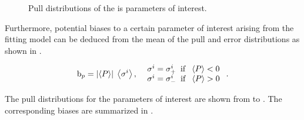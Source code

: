 \begin{figure}[!t]
  \centering
  \begin{subfigure}{0.5\textwidth}
    \raggedright
    \scalebox{0.57}{}
    \caption{}
    \label{pull_ACP0}
  \end{subfigure}%
  \hfill%
  \begin{subfigure}{0.5\textwidth}
    \raggedleft
    \scalebox{0.57}{}
    \caption{}
    \label{pull_ACPperp}
  \end{subfigure}
  \begin{subfigure}{0.5\textwidth}
    \raggedright
    \scalebox{0.57}{}
    \caption{}
    \label{pull_ACPpar}
  \end{subfigure}%
  \hfill%
  \begin{subfigure}{0.5\textwidth}
    \raggedleft
    \scalebox{0.57}{}
    \caption{}
    \label{pull_ACPS}
  \end{subfigure}
\caption{Pull distributions of the \Acp{i} parameters of interest.}
\label{pull_acp}
\end{figure}

Furthermore, potential biases to a certain parameter of interest arising from the fitting model
can be deduced from the mean of the pull and error distributions as shown in .

\begin{equation}
{\rm b}_p = \left|\left<P\right>\right| \; \left<\sigma^i\right>,\;\; \left.
  \begin{array}{ll}
    \sigma^i = \sigma^i_+ \;\;{\rm if}\;\; \left<P\right> < 0 \\
    \sigma^i = \sigma^i_- \;\;{\rm if}\;\; \left<P\right> > 0
  \end{array} \right. .
\label{bias_def}
\end{equation}

The pull distributions for the parameters of interest are shown from  to .
The corresponding biases are summarized in .

